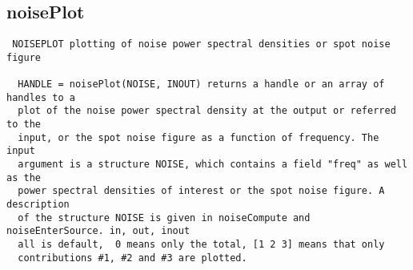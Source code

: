 \newpage
\subsection{noisePlot}
\label{sec:noisePlot}
\begin{verbatim}
 NOISEPLOT plotting of noise power spectral densities or spot noise figure
 
  HANDLE = noisePlot(NOISE, INOUT) returns a handle or an array of handles to a
  plot of the noise power spectral density at the output or referred to the
  input, or the spot noise figure as a function of frequency. The input
  argument is a structure NOISE, which contains a field "freq" as well as the
  power spectral densities of interest or the spot noise figure. A description
  of the structure NOISE is given in noiseCompute and noiseEnterSource. in, out, inout
  all is default,  0 means only the total, [1 2 3] means that only
  contributions #1, #2 and #3 are plotted. 

\end{verbatim}

\newpage
\newpage
